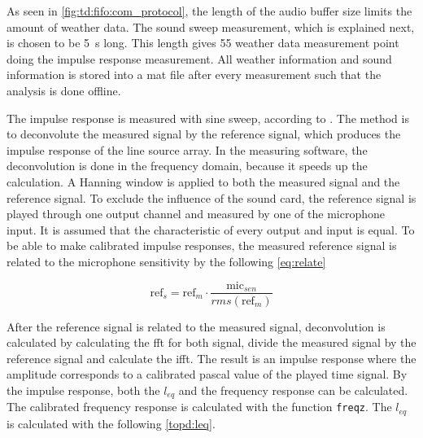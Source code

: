 
As seen in \autoref{fig:td:fifo:com_protocol}, the length of the audio buffer size limits the amount of weather data. The sound sweep measurement, which is explained next, is chosen to be \SI{5}{\second} long. This length gives 55 weather data measurement point doing the impulse response measurement. All weather information and sound information is stored into a mat file after every measurement such that the analysis is done offline.

The impulse response is measured with sine sweep, according to \citep{mller2001transfer}. The method is to deconvolute the measured signal by the reference signal, which produces the impulse response of the line source array. In the measuring software, the deconvolution is done in the frequency domain, because it speeds up the calculation. A Hanning window is applied to both the measured signal and the reference signal. To exclude the influence of the sound card, the reference signal is played through one output channel and measured by one of the microphone input. It is assumed that the characteristic of every output and input is equal. To be able to make calibrated impulse responses, the measured reference signal is related to the microphone sensitivity by the following \autoref{eq:relate}

\begin{equation}\label{eq:relate}
\text{ref}_{s} = \text{ref}_{m} \cdot    \frac{\text{mic}_{sen}}{rms(\text{ref}_{m})}
\end{equation}

\startexplain
{}
\stopexplain

After the reference signal is related to the measured signal, deconvolution is calculated by calculating the \gls{fft} for both signal, divide the measured signal by the reference signal and calculate the \gls{ifft}. The result is an impulse response where the amplitude corresponds to a calibrated pascal value of the played time signal. By the impulse response, both the $l_{eq}$ and the frequency response can be calculated. The calibrated frequency response is calculated with the \matlab function \texttt{freqz}. The $l_{eq}$ is calculated with the following \autoref{topd:leq}.



